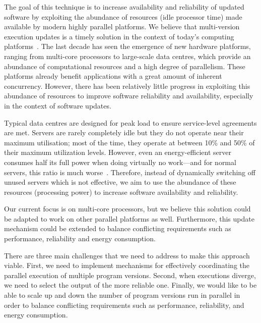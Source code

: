The goal of this technique is to increase availability and reliability of
updated software by exploiting the abundance of resources (\eg idle processor
time) made available by modern highly parallel platforms.  We believe that
multi-version execution updates is a timely solution in the context of today's
computing platforms~\cite{multiplicity}. The last decade has seen the emergence
of new hardware platforms, ranging from multi-core processors to large-scale
data centres, which provide an abundance of computational resources and a high
degree of parallelism. These platforms already benefit applications with a
great amount of inherent concurrency.  However, there has been relatively
little progress in exploiting this abundance of resources to improve software
reliability and availability, especially in the context of software updates.

Typical data centres are designed for peak load to ensure service-level
agreements are met. Servers are rarely completely idle but they do not operate
near their maximum utilisation; most of the time, they operate at between 10\%
and 50\% of their maximum utilization levels. However, even an energy-efficient
server consumes half its full power when doing virtually no work---and for
normal servers, this ratio is much worse~\cite{barroso2007}.  Therefore,
instead of dynamically switching off unused servers which is not effective, we
aim to use the abundance of these resources (\ie processing power) to increase
software availability and reliability.

Our current focus is on multi-core processors, but we believe this solution
could be adapted to work on other parallel platforms as well.  Furthermore,
this update mechanism could be extended to balance conflicting requirements
such as performance, reliability and energy consumption.

There are three main challenges that we need to address to make this approach
viable. First, we need to implement mechanisms for effectively coordinating the
parallel execution of multiple program versions.  Second, when executions
diverge, we need to select the output of the more reliable one.  Finally, we
would like to be able to scale up and down the number of program versions run
in parallel in order to balance conflicting requirements such as performance,
reliability, and energy consumption.

